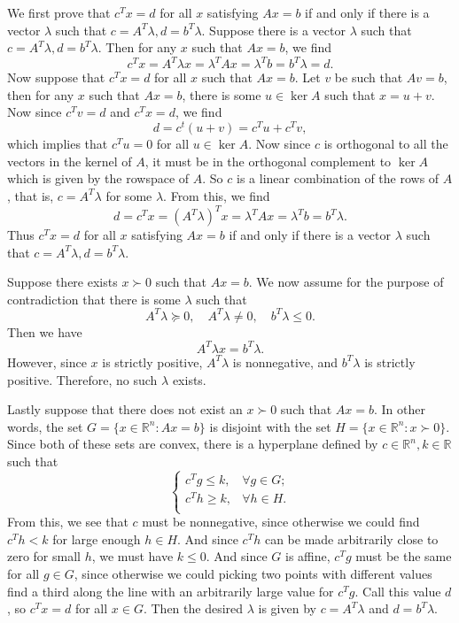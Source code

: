 \documentclass[12pt]{article}
\newcommand{\R}{\mathbb{R}}
\begin{document}
We first prove that $c^Tx = d$ for all $x$ satisfying $Ax=b$ if and only if there is a vector $\lambda$ such that $c=A^T\lambda, d=b^T\lambda$. Suppose there is a vector $\lambda$ such that $c=A^T\lambda, d=b^T\lambda$. Then for any $x$ such that $Ax=b$, we find
\[c^Tx = A^T\lambda x = \lambda^TAx = \lambda^Tb = b^T\lambda = d.\]
Now suppose that $c^Tx=d$ for all $x$ such that $Ax=b$. Let $v$ be such that $Av=b$, then for any $x$ such that $Ax=b$, there is some $u\in\ker A$ such that $x=u+v$. Now since $c^Tv=d$ and $c^Tx=d$, we find
\[d = c^t(u+v) = c^Tu + c^Tv,\]
which implies that $c^Tu=0$ for all $u\in\ker A$. Now since $c$ is orthogonal to all the vectors in the kernel of $A$, it must be in the orthogonal complement to $\ker A$ which is given by the rowspace of $A$. So $c$ is a linear combination of the rows of $A$, that is, $c = A^T\lambda$ for some $\lambda$. From this, we find
\[d = c^Tx = (A^T\lambda)^Tx = \lambda^TAx = \lambda^Tb = b^T\lambda.\]
Thus $c^Tx = d$ for all $x$ satisfying $Ax=b$ if and only if there is a vector $\lambda$ such that $c=A^T\lambda, d=b^T\lambda$.

Suppose there exists $x\succ0$ such that $Ax=b$. We now assume for the purpose of contradiction that there is some $\lambda$ such that
\[A^T\lambda \succeq 0, \quad A^T\lambda \ne 0, \quad b^T\lambda \leq 0.\]
Then we have
\[A^T\lambda x = b^T\lambda.\]
However, since $x$ is strictly positive,  $A^T\lambda$ is nonnegative, and $b^T\lambda$ is strictly positive. Therefore, no such $\lambda$ exists.

Lastly suppose that there does not exist an $x\succ0$ such that $Ax=b$. In other words, the set $G=\{x\in\R^n : Ax=b\}$ is disjoint with the set $H=\{x\in\R^n : x\succ0\}$. Since both of these sets are convex, there is a hyperplane defined by $c\in\R^n,k\in\R$ such that 
\[ \begin{cases}
    c^Tg \leq k, & \forall g\in G;  \\
    c^Th \geq k, & \forall h\in H.  \\
\end{cases}\]
From this, we see that $c$ must be nonnegative, since otherwise we could find $c^Th<k$ for large enough $h\in H$. And since $c^Th$ can be made arbitrarily close to zero for small $h$, we must have $k\leq 0$. And since $G$ is affine, $c^Tg$ must be the same for all $g\in G$, since otherwise we could picking two points with different values find a third along the line with an arbitrarily large value for $c^Tg$. Call this value $d$, so $c^Tx=d$ for all $x\in G$. Then the desired $\lambda$ is given by $c=A^T\lambda$ and $d=b^T\lambda$.
\end{document}

